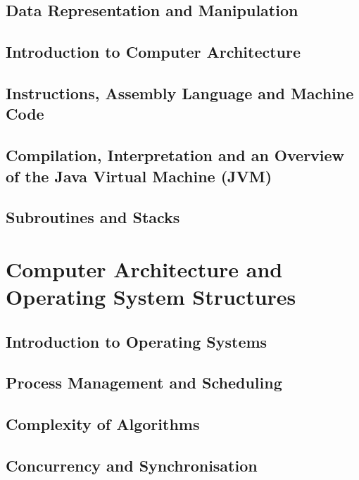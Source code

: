 \documentclass[
  11pt,
  a4paper,
]{book}
\begin{document}
\section{Data Representation and Manipulation}


\section{Introduction to Computer Architecture}


\section{Instructions, Assembly Language and Machine Code}


\section[Compilation, Interpretation and the JVM]{Compilation, Interpretation and an Overview of the Java Virtual Machine (JVM)}


\section{Subroutines and Stacks}


\chapter[Computer Architecture and OS Structures]{Computer Architecture and Operating System Structures}
\section{Introduction to Operating Systems}



\section{Process Management and Scheduling}

\section{Complexity of Algorithms}


\section{Concurrency and Synchronisation}


\end{document}
